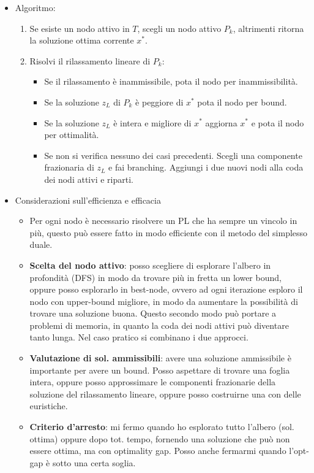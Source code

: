 \begin{itemize}
	\item Algoritmo:
	\begin{enumerate}
		\item Se esiste un nodo attivo in $T$, scegli un nodo attivo $P_k$, altrimenti ritorna la soluzione ottima corrente $x^*$.
		\item Risolvi il rilassamento lineare di $P_k$:
		\begin{itemize}
			\item Se il rilassamento è inammissibile, pota il nodo per inammissibilità.
			\item Se la soluzione $z_L$ di $P_k$ è peggiore di $x^*$ pota il nodo per bound.
			\item Se la soluzione $z_L$ è intera e migliore di $x^*$ aggiorna $x^*$ e pota il nodo per ottimalità.
			\item Se non si verifica nessuno dei casi precedenti. Scegli una componente frazionaria di $z_L$ e fai branching. Aggiungi i due nuovi nodi alla coda dei nodi attivi e riparti.
		\end{itemize}
	\end{enumerate}
	\item Considerazioni sull'efficienza e efficacia
	\begin{itemize}
		\item Per ogni nodo è necessario risolvere un PL che ha sempre un vincolo in più, questo può essere fatto in modo efficiente con il metodo del simplesso duale.
		\item \textbf{Scelta del nodo attivo}: posso scegliere di esplorare l'albero in profondità (DFS) in modo da trovare più in fretta un lower bound, oppure posso esplorarlo in best-node, ovvero ad ogni iterazione esploro il nodo con upper-bound migliore, in modo da aumentare la possibilità di trovare una soluzione buona. Questo secondo modo può portare a problemi di memoria, in quanto la coda dei nodi attivi può diventare tanto lunga. Nel caso pratico si combinano i due approcci.
		\item \textbf{Valutazione di sol. ammissibili}: avere una soluzione ammissibile è importante per avere un bound. Posso aspettare di trovare una foglia intera, oppure posso approssimare le componenti frazionarie della soluzione del rilassamento lineare, oppure posso costruirne una con delle euristiche.
		\item \textbf{Criterio d'arresto}: mi fermo quando ho esplorato tutto l'albero (sol. ottima) oppure dopo tot. tempo, fornendo una soluzione che può non essere ottima, ma con optimality gap. Posso anche fermarmi quando l'opt-gap è sotto una certa soglia.

\end{itemize}
\end{itemize}
